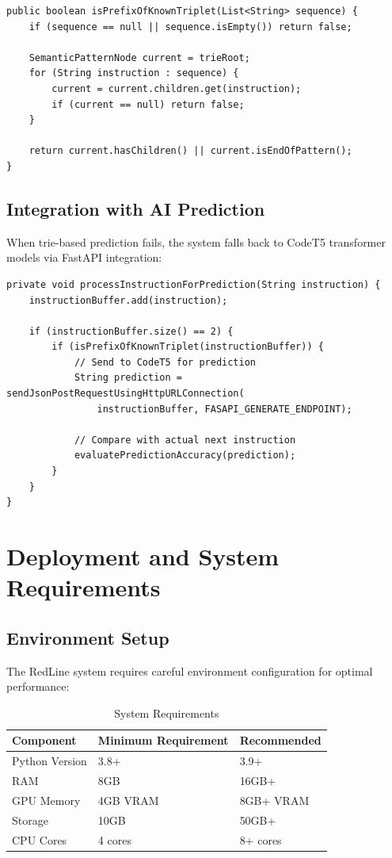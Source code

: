 \documentclass[12pt,a4paper]{article}
\begin{document}
\begin{lstlisting}[caption=Trie Pattern Matching]
public boolean isPrefixOfKnownTriplet(List<String> sequence) {
    if (sequence == null || sequence.isEmpty()) return false;
    
    SemanticPatternNode current = trieRoot;
    for (String instruction : sequence) {
        current = current.children.get(instruction);
        if (current == null) return false;
    }
    
    return current.hasChildren() || current.isEndOfPattern();
}
\end{lstlisting}

\subsection{Integration with AI Prediction}

When trie-based prediction fails, the system falls back to CodeT5 transformer models via FastAPI integration:

\begin{lstlisting}[caption=AI Prediction Integration]
private void processInstructionForPrediction(String instruction) {
    instructionBuffer.add(instruction);
    
    if (instructionBuffer.size() == 2) {
        if (isPrefixOfKnownTriplet(instructionBuffer)) {
            // Send to CodeT5 for prediction
            String prediction = sendJsonPostRequestUsingHttpURLConnection(
                instructionBuffer, FASAPI_GENERATE_ENDPOINT);
            
            // Compare with actual next instruction
            evaluatePredictionAccuracy(prediction);
        }
    }
}
\end{lstlisting}

\section{Deployment and System Requirements}

\subsection{Environment Setup}

The RedLine system requires careful environment configuration for optimal performance:

\begin{table}[H]
\centering
\begin{tabular}{|l|l|l|}
\hline
\textbf{Component} & \textbf{Minimum Requirement} & \textbf{Recommended} \\
\hline
Python Version & 3.8+ & 3.9+ \\
RAM & 8GB & 16GB+ \\
GPU Memory & 4GB VRAM & 8GB+ VRAM \\
Storage & 10GB & 50GB+ \\
CPU Cores & 4 cores & 8+ cores \\
\hline
\end{tabular}
\caption{System Requirements}
\label{tab:system-requirements}
\end{table}
\end{document}
